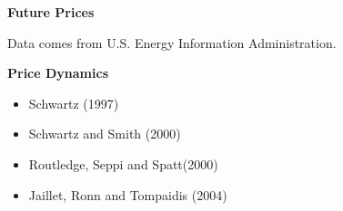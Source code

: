 \documentclass{beamer}
\begin{document}
\begin{frame}
{\bf Future Prices}
\begin{center}
Data comes from U.S. Energy Information Administration.
\end{center}
\end{frame}

\begin{frame}
{\bf Price Dynamics}

      \begin{itemize}
      \item Schwartz (1997) %
      \item Schwartz and Smith (2000)
      \item Routledge, Seppi and Spatt(2000)
      \item Jaillet, Ronn and Tompaidis (2004)%
      \end{itemize}
\end{frame}
\end{document}

